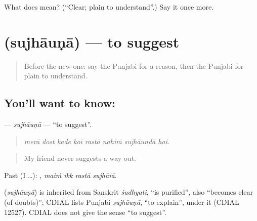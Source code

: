 \begin{tcolorbox}[breakable,colback=teal!4,colframe=teal!35!black,title={Before you move on}]
What does  mean? (\textquotedblleft{}Clear; plain to understand\textquotedblright{}.) Say it once more.
\end{tcolorbox}
\section[\texorpdfstring{\pa{ਸੁਝਾਉਣਾ} (sujhāuṇā)}{ਸੁਝਾਉਣਾ (sujhāuṇā)}]{ (sujhāuṇā) — to suggest}

\label{lesson:PA-C342-sujhauna}



\begin{quote}
Before the new one: say the Punjabi for a reason, then the Punjabi for plain to understand.
\end{quote}

\subsection*{You'll want to know: }
\textbf{} — \emph{sujhāuṇā} — \textquotedblleft{}to suggest\textquotedblright{}.

\begin{quote}
       
\end{quote}

\begin{quote}
\emph{merā dost kade koī rastā nahīṁ sujhāundā hai.}
\end{quote}

\begin{quote}
My friend never suggests a way out.
\end{quote}

Past (I …):    , \emph{maiṁ ikk rastā sujhāiā}.

\begin{cousinweb}
\textbf{} (\emph{sujhāuṇā}) is inherited from Sanskrit \emph{śudhyati}, \textquotedblleft{}is purified\textquotedblright{}, also \textquotedblleft{}becomes clear (of doubts)\textquotedblright{}; CDIAL lists Punjabi \emph{sujhāuṇā}, \textquotedblleft{}to explain\textquotedblright{}, under it (CDIAL 12527). CDIAL does not give the sense \textquotedblleft{}to suggest\textquotedblright{}.
\end{cousinweb}

